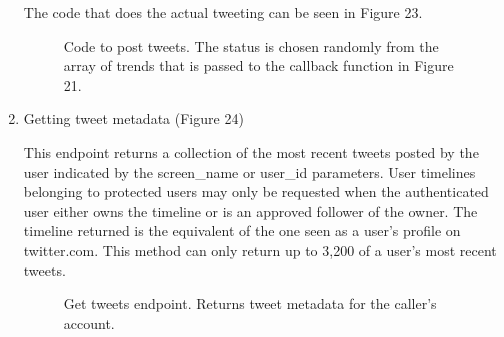 \documentclass[12pt]{article} %
\begin{document}
\begin{enumerate}
		The code that does the actual tweeting can be seen in Figure 23.

		\begin{figure}[H] %
		\caption{Code to post tweets. The status is chosen randomly from the array of trends that is passed to the callback function in Figure 21.}
		\label{tweetOut}
		\end{figure}

		\item Getting tweet metadata (Figure 24)

		This endpoint returns a collection of the most recent tweets posted by the user indicated by the screen\_name or user\_id parameters.
		User timelines belonging to protected users may only be requested when the authenticated user either owns the timeline or is an approved follower of the owner.
		The timeline returned is the equivalent of the one seen as a user’s profile on twitter.com.
		This method can only return up to 3,200 of a user’s most recent tweets.

		\begin{figure}[H] %
		\caption{Get tweets endpoint. Returns tweet metadata for the caller's account.}
		\label{getTweetEndpoint}
		\end{figure}


\end{enumerate}
\end{document}
